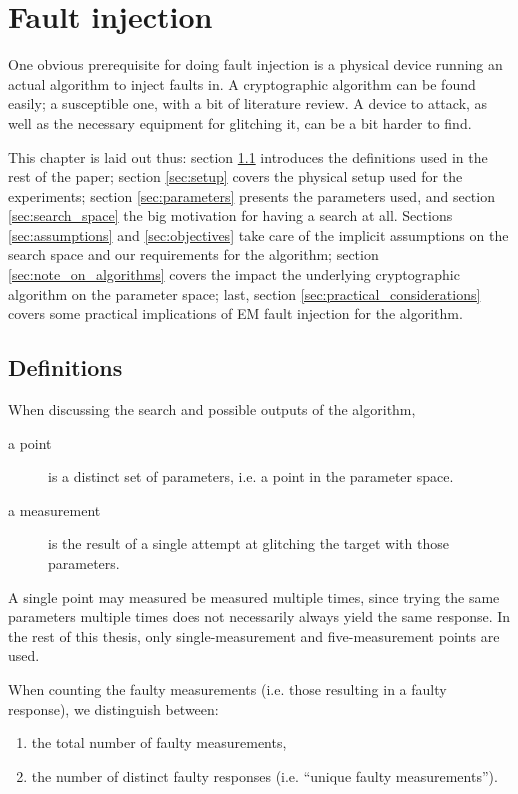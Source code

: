 \documentclass[times, utf8, diplomski]{fer}
\begin{document}
\chapter{Fault injection}\label{ch:fault_injection}
One obvious prerequisite for doing fault injection is a physical device running
an actual algorithm to inject faults in. A cryptographic algorithm can be found
easily; a susceptible one, with a bit of literature review. A device to
attack, as well as the necessary equipment for glitching it, can be a bit harder
to find.

This chapter is laid out thus: section \ref{sec:definitions} introduces the
definitions used in the rest of the paper; section \ref{sec:setup} covers
the physical setup used for the experiments; section \ref{sec:parameters}
presents the parameters used, and section \ref{sec:search_space} the big
motivation for having a search at all. Sections \ref{sec:assumptions} and
\ref{sec:objectives} take care of the implicit assumptions on the search
space and our requirements for the algorithm; section \ref{sec:note_on_algorithms}
covers the impact the underlying cryptographic algorithm on the parameter
space; last, section \ref{sec:practical_considerations} covers some practical
implications of EM fault injection for the algorithm.



\section{Definitions}\label{sec:definitions}
When discussing the search and possible outputs of the algorithm,
\begin{description}
    \item[a point] is a distinct set of parameters, i.e. a point in the parameter space.
    \item[a measurement] is the result of a single attempt at glitching the target with those parameters.
\end{description}

A single point may measured be measured multiple times, since trying the same
parameters multiple times does not necessarily always yield the same response.
In the rest of this thesis, only single-measurement and five-measurement points
are used.

When counting the faulty measurements (i.e. those resulting in a faulty
response), we distinguish between:
\begin{enumerate}
    \item the total number of faulty measurements,
    \item the number of distinct faulty responses (i.e. ``unique faulty measurements'').
\end{enumerate}
\end{document}
